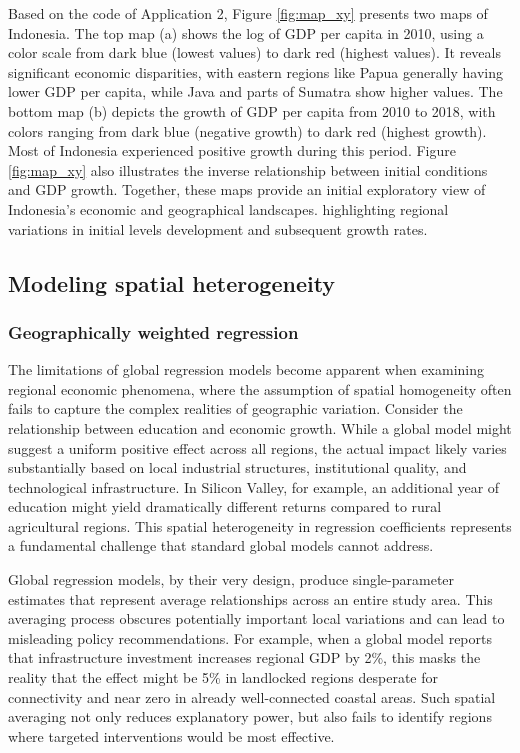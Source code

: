 \documentclass[smallextended, natbib]{svjour3}       %
\begin{document}
Based on the code of Application 2, Figure \ref{fig:map_xy} presents two maps of Indonesia.
The top map (a) shows the log of GDP per capita in 2010, using a color scale from dark blue (lowest values) to dark red (highest values). 
It reveals significant economic disparities, with eastern regions like Papua generally having lower GDP per capita, while Java and parts of Sumatra show higher values. 
The bottom map (b) depicts the growth of GDP per capita from 2010 to 2018, with colors ranging from dark blue (negative growth) to dark red (highest growth). 
Most of Indonesia experienced positive growth during this period.
Figure \ref{fig:map_xy} also illustrates the  inverse relationship between initial conditions and GDP growth.
Together, these maps provide an initial exploratory view of Indonesia's economic and geographical landscapes. highlighting regional variations in initial levels development and subsequent growth rates.


\subsection{Modeling spatial heterogeneity}

\subsubsection{Geographically weighted regression}

The limitations of global regression models become apparent when examining regional economic phenomena, where the assumption of spatial homogeneity often fails to capture the complex realities of geographic variation. 
Consider the relationship between education and economic growth.
While a global model might suggest a uniform positive effect across all regions, the actual impact likely varies substantially based on local industrial structures, institutional quality, and technological infrastructure. 
In Silicon Valley, for example, an additional year of education might yield dramatically different returns compared to rural agricultural regions. 
This spatial heterogeneity in regression coefficients represents a fundamental challenge that standard global  models cannot address.

Global regression models, by their very design, produce single-parameter estimates that represent average relationships across an entire study area. 
This averaging process obscures potentially important local variations and can lead to misleading policy recommendations. 
For example, when a global model reports that infrastructure investment increases regional GDP by 2\%, this masks the reality that the effect might be 5\% in landlocked regions desperate for connectivity and near zero in already well-connected coastal areas. 
Such spatial averaging not only reduces explanatory power, but also fails to identify regions where targeted interventions would be most effective.
\end{document}
